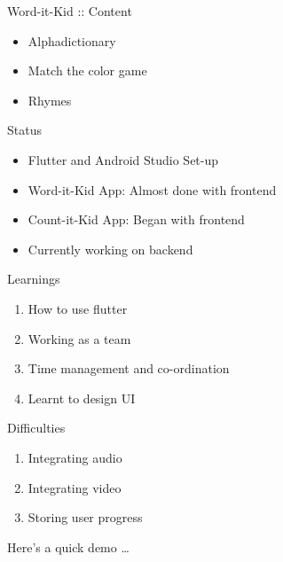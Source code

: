 \documentclass[14pt]{beamer}
\begin{document}
\begin{frame}{Word-it-Kid :: Content}
    \begin{itemize}
            \pause
        \item Alphadictionary
            \pause
        \item Match the color game
            \pause
        \item Rhymes
    \end{itemize}
\end{frame}

\begin{frame}{Status}
    \begin{itemize}
        \item Flutter and Android Studio Set-up
        \item Word-it-Kid App: Almost done with frontend
        \item Count-it-Kid App: Began with frontend
        \item Currently working on backend
    \end{itemize}
\end{frame}

\begin{frame}{Learnings}
    \begin{enumerate}
        \item How to use flutter
        \item Working as a team
        \item Time management and co-ordination
        \item Learnt to design UI
    \end{enumerate}
\end{frame}

\begin{frame}{Difficulties}
    \begin{enumerate}
        \item Integrating audio
        \item Integrating video
        \item Storing user progress
    \end{enumerate}
\end{frame}

\begin{frame}[standout]
    Here's a quick demo \ldots
\end{frame}
\end{document}
